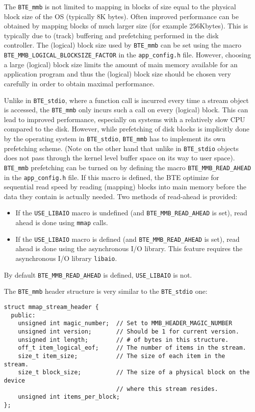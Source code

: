 The \verb|BTE_mmb| is not limited to mapping in blocks of size equal to the
physical block size of the OS (typically 8K bytes). Often improved
performance can be obtained by mapping blocks of much larger size (for
example 256Kbytes). This is typically due to (track) buffering and
prefetching performed in the disk controller. The (logical) block size used
by \verb|BTE_mmb| can be set using the macro
\verb|BTE_MMB_LOGICAL_BLOCKSIZE_FACTOR| in the \verb|app_config.h|
file. However, choosing a large (logical) block size limits the amount of
main memory available for an application program and thus the (logical)
block size should be chosen very carefully in order to obtain maximal
performance.

Unlike in \verb|BTE_stdio|, where a function call is incurred every time a
stream object is accessed, the \verb|BTE_mmb| only incurs such a call on
every (logical) block. This can lead to improved performance, especially on
systems with a relatively slow CPU compared to the disk. However, while
prefetching of disk blocks is implicitly done by the operating system in
\verb|BTE_stdio|, \verb|BTE_mmb| has to implement its own prefetching
scheme. (Note on the other hand that unlike in \verb|BTE_stdio| objects
does not pass through the kernel level buffer space on its way to user
space). \verb|BTE_mmb| prefetching can be turned on by defining the macro
\verb|BTE_MMB_READ_AHEAD| in the \verb|app_config.h| file. If this macro is
defined, the BTE optimize for sequential read speed by reading (mapping)
blocks into main memory before the data they contain is actually
needed. Two methods of read-ahead is provided:
\begin{itemize}
\item If the \verb|USE_LIBAIO| macro is undefined (and
\verb|BTE_MMB_READ_AHEAD| is set), read ahead is done using \verb|mmap|
calls.
\item If the \verb|USE_LIBAIO| macro is defined (and
\verb|BTE_MMB_READ_AHEAD| is set), read ahead is done using the
asynchronous I/O library. This feature requires the asynchronous I/O
library {\tt libaio}.
\end{itemize}
By default \verb|BTE_MMB_READ_AHEAD| is defined, \verb|USE_LIBAIO| is
not.

The \verb|BTE_mmb| header structure is very similar to the \verb|BTE_stdio|
one:
\begin{verbatim}
struct mmap_stream_header { 
  public:
    unsigned int magic_number;  // Set to MMB_HEADER_MAGIC_NUMBER
    unsigned int version;       // Should be 1 for current version.
    unsigned int length;        // # of bytes in this structure.
    off_t item_logical_eof;     // The number of items in the stream.
    size_t item_size;           // The size of each item in the stream.
    size_t block_size;          // The size of a physical block on the device
                                // where this stream resides.
    unsigned int items_per_block;
};
\end{verbatim}

